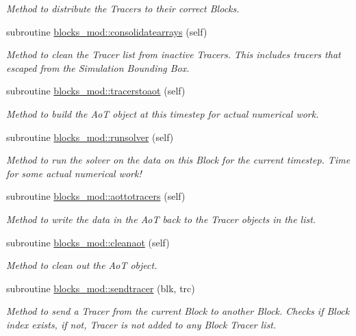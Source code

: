 \begin{DoxyCompactItemize}
\begin{DoxyCompactList}\small\item\em Method to distribute the Tracers to their correct Blocks. \end{DoxyCompactList}\item 
subroutine \mbox{\hyperlink{namespaceblocks__mod_a25ff530b5125e4cee5b1f474b2491883}{blocks\+\_\+mod\+::consolidatearrays}} (self)
\begin{DoxyCompactList}\small\item\em Method to clean the Tracer list from inactive Tracers. This includes tracers that escaped from the Simulation Bounding Box. \end{DoxyCompactList}\item 
subroutine \mbox{\hyperlink{namespaceblocks__mod_ae7afa742f8f89a6a8afdefb7f8c87efd}{blocks\+\_\+mod\+::tracerstoaot}} (self)
\begin{DoxyCompactList}\small\item\em Method to build the AoT object at this timestep for actual numerical work. \end{DoxyCompactList}\item 
subroutine \mbox{\hyperlink{namespaceblocks__mod_a3245bdadbec6bb123c517921d1503b48}{blocks\+\_\+mod\+::runsolver}} (self)
\begin{DoxyCompactList}\small\item\em Method to run the solver on the data on this Block for the current timestep. Time for some actual numerical work! \end{DoxyCompactList}\item 
subroutine \mbox{\hyperlink{namespaceblocks__mod_a27c7e788c5f3979bfe9d43aad138286a}{blocks\+\_\+mod\+::aottotracers}} (self)
\begin{DoxyCompactList}\small\item\em Method to write the data in the AoT back to the Tracer objects in the list. \end{DoxyCompactList}\item 
subroutine \mbox{\hyperlink{namespaceblocks__mod_a6cc313e046daa2720cbca810d083faa0}{blocks\+\_\+mod\+::cleanaot}} (self)
\begin{DoxyCompactList}\small\item\em Method to clean out the AoT object. \end{DoxyCompactList}\item 
subroutine \mbox{\hyperlink{namespaceblocks__mod_a5a9992de40470e417ec8e40e688f6a0e}{blocks\+\_\+mod\+::sendtracer}} (blk, trc)
\begin{DoxyCompactList}\small\item\em Method to send a Tracer from the current Block to another Block. Checks if Block index exists, if not, Tracer is not added to any Block Tracer list. \end{DoxyCompactList}\item 

\end{DoxyCompactItemize}

